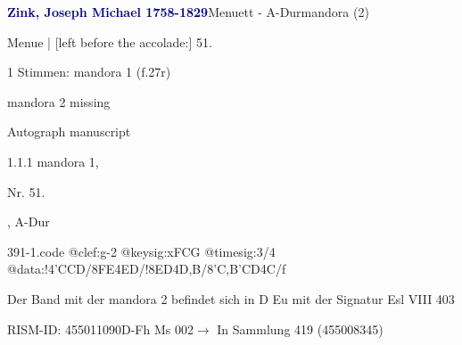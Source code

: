 \documentclass[twocolumn, 12pt]{book}
\begin{document}
\par \vspace{16pt} \textcolor{darkblue}{\textbf{Zink, Joseph Michael  1758-1829}}\hfillplus{\textbf{[391]}}\newline Menuett - A-Dur\newline mandora (2)
\par \begin{itshape}[f.27r, at left:] Menue | [left before the accolade:] 51.\end{itshape} 
\par \textcolor{darkblue}{}  1 Stimmen: mandora 1  (f.27r)\newline \begin{small} mandora 2 missing\end{small} \newline Autograph manuscript
\par 1.1.1  mandora 1, \begin{itshape}Nr. 51.\end{itshape}, A-Dur  
\begin{filecontents*}{391-1.code}
@clef:g-2
@keysig:xFCG
@timesig:3/4
@data:!4'CCD/{8FE}4ED/!{8ED}4D,B/{8'C,B}{'CD}4C/f
\end{filecontents*}
\newline %
\par Der Band mit der mandora 2 befindet sich in D Eu mit der Signatur Esl VIII 403
\par RISM-ID: 455011090\newline D-Fh  Ms 002\newline $\rightarrow$ In Sammlung 419 (455008345)
      
\end{document}
